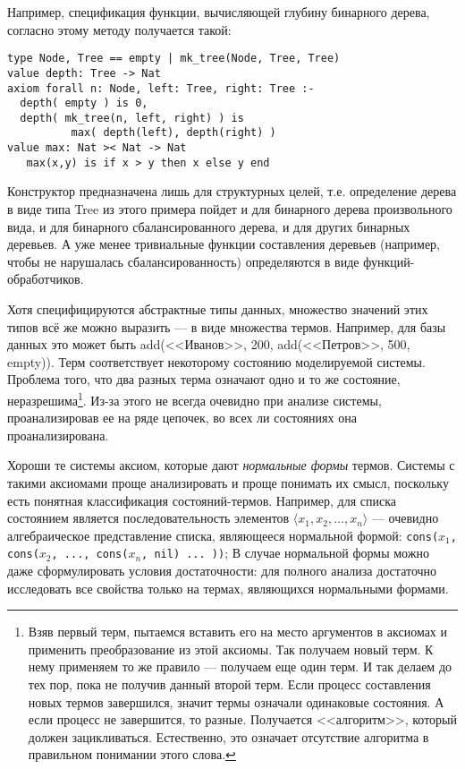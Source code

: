 Например, спецификация функции, вычисляющей глубину бинарного дерева, согласно этому методу получается такой:
\begin{lstlisting}
type Node, Tree == empty | mk_tree(Node, Tree, Tree)
value depth: Tree -> Nat
axiom forall n: Node, left: Tree, right: Tree :-
  depth( empty ) is 0,
  depth( mk_tree(n, left, right) ) is
          max( depth(left), depth(right) )
value max: Nat >< Nat -> Nat
   max(x,y) is if x > y then x else y end
\end{lstlisting}

Конструктор предназначена лишь для структурных целей, т.е. определение дерева в виде типа Tree из этого примера пойдет и для бинарного дерева произвольного вида, и для бинарного сбалансированного дерева, и для других бинарных деревьев. А уже менее тривиальные функции составления деревьев (например, чтобы не нарушалась сбалансированность) определяются в виде функций-обработчиков.


Хотя специфицируются абстрактные типы данных, множество значений этих типов всё же можно выразить --- в виде множества термов. Например, для базы данных это может быть add(<<Иванов>>, 200, add(<<Петров>>, 500, empty)). Терм соответствует некоторому состоянию моделируемой системы. Проблема того, что два разных терма означают одно и то же состояние, неразрешима\footnote{Взяв первый терм, пытаемся вставить его на место аргументов в аксиомах и применить преобразование из этой аксиомы. Так получаем новый терм. К нему применяем то же правило --- получаем еще один терм. И так делаем до тех пор, пока не получив данный второй терм. Если процесс составления новых термов завершился, значит термы означали одинаковые состояния. А если процесс не завершится, то разные. Получается <<алгоритм>>, который должен зацикливаться. Естественно, это означает отсутствие алгоритма в правильном понимании этого слова.}. Из-за этого не всегда очевидно при анализе системы, проанализировав ее на ряде цепочек, во всех ли состояниях она проанализирована.

Хороши те системы аксиом, которые дают \emph{нормальные формы} термов. Системы с такими аксиомами проще анализировать и проще понимать их смысл, поскольку есть понятная классификация состояний-термов. Например, для списка состоянием является последовательность элементов $\langle x_1, x_2, ..., x_n \rangle$ --- очевидно алгебраическое представление списка, являющееся нормальной формой: \texttt{cons($x_1$, cons($x_2$, ..., cons($x_n$, nil) ... ))}; В случае нормальной формы можно даже сформулировать условия достаточности: для полного анализа достаточно исследовать все свойства только на термах, являющихся нормальными формами.

